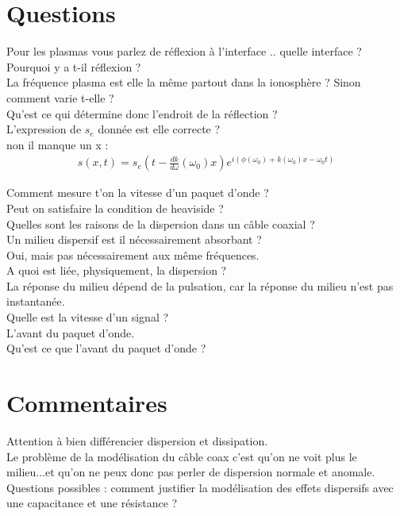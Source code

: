 \documentclass[12pt,prb,aps,epsf]{article}
\begin{document}
\section*{Questions}
Pour les plasmas vous parlez de réflexion à l'interface .. quelle interface ?\\
Pourquoi y a t-il réflexion ?\\
La fréquence plasma est elle la même partout dans la ionosphère ? Sinon comment varie t-elle ?\\
Qu'est ce qui détermine donc l'endroit de la réflection ?\\

L'expression de $s_e$ donnée est elle correcte ?\\
non il manque un x : 
\begin{eqnarray}
s(x,t) = s_e(t-\frac{dk}{d\omega}(\omega_0)x)e^{i(\phi(\omega_0) + k(\omega_0)x-\omega_0t)}
\end{eqnarray}

Comment mesure t'on la vitesse d'un paquet d'onde ?\\

Peut on satisfaire la condition de heaviside ?\\

Quelles sont les raisons de la dispersion dans un câble coaxial ?\\

Un milieu dispersif est il nécessairement absorbant ?\\
Oui, mais pas nécessairement aux même fréquences.\\

A quoi est liée, physiquement, la dispersion ?\\
La réponse du milieu dépend de la pulsation, car la réponse du milieu n'est pas instantanée.\\

Quelle est la vitesse d'un signal ? \\
L'avant du paquet d'onde.\\

Qu'est ce que l'avant du paquet d'onde ?

\section*{Commentaires}
Attention à bien différencier dispersion et dissipation.\\
Le problème de la modélisation du câble coax c'est qu'on ne voit plus le milieu...et qu'on ne peux donc pas perler de dispersion normale et anomale.\\
Questions possibles : comment justifier la modélisation des effets dispersifs avec une capacitance et une résistance ?
\end{document}

